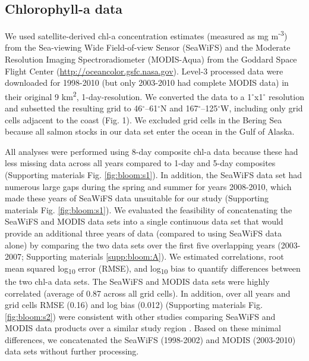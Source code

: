 \subsection{Chlorophyll-a data}

We used satellite-derived chl-a concentration estimates (measured as mg
m\textsuperscript{-3}) from the Sea-viewing Wide Field-of-view Sensor (SeaWiFS)
and the Moderate Resolution Imaging Spectroradiometer (MODIS-Aqua) from the
Goddard Space Flight Center (\url{http://oceancolor.gsfc.nasa.gov}). Level-3
processed data were downloaded for 1998-2010 (but only 2003-2010 had complete
MODIS data) in their original 9 km\textsuperscript{2}, 1-day-resolution. We
converted the data to a 1$^{\circ}$x1$^{\circ}$ resolution and subsetted the
resulting grid to 46$^{\circ}$--61$^{\circ}$N and 167$^{\circ}$--125$^{\circ}$W,
including only grid cells adjacent to the coast (Fig.  1). We excluded grid
cells in the Bering Sea because all salmon stocks in our data set enter the
ocean in the Gulf of Alaska.

All analyses were performed using 8-day composite chl-a data because these had
less missing data across all years compared to 1-day and 5-day composites
(Supporting materials Fig. \ref{fig:bloom:s1}). In addition, the SeaWiFS data set had numerous
large gaps during the spring and summer for years 2008-2010, which made these
years of SeaWiFS data unsuitable for our study (Supporting materials Fig. \ref{fig:bloom:s1}). We
evaluated the feasibility of concatenating the SeaWiFS and MODIS data sets into
a single continuous data set that would provide an additional three years of
data (compared to using SeaWiFS data alone) by comparing the two data sets over
the first five overlapping years (2003-2007; Supporting materials
\ref{supp:bloom:A}). We
estimated correlations, root mean squared log\textsubscript{10} error (RMSE),
and log\textsubscript{10} bias to quantify differences between the two chl-a
data sets. The SeaWiFS and MODIS data sets were highly correlated (average of
0.87 across all grid cells). In addition, over all years and grid cells RMSE
(0.16) and log bias (0.012) (Supporting materials Fig. \ref{fig:bloom:s2}) were consistent with
other studies comparing SeaWiFS and MODIS data products over a similar study
region \citep{Waite2013}. Based on these minimal differences, we concatenated
the SeaWiFS (1998-2002) and MODIS (2003-2010) data sets without further
processing.

